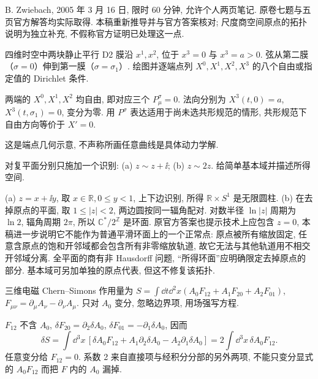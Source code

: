 B. Zwiebach, 2005 年 3 月 16 日, 限时 60 分钟, 允许个人两页笔记. 原卷七题与五页官方解答均实际取得. 本稿重新推导并与官方答案核对; 尺度商空间原点的拓扑说明为独立补充, 不假称官方证明已处理这一点.

\begin{exercise}
四维时空中两块静止平行 D2 膜沿 $x^1,x^2$, 位于 $x^3=0$ 与 $x^3=a>0$. 弦从第二膜（$\sigma=0$）伸到第一膜（$\sigma=\sigma_1$）. 绘图并逐端点列 $X^0,X^1,X^2,X^3$ 的八个自由或指定值的 Dirichlet 条件.
\end{exercise}
\begin{solution}
两端的 $X^0,X^1,X^2$ 均自由, 即对应三个 $P^\sigma_\mu=0$. 法向分别为 $X^3(t,0)=a$, $X^3(t,\sigma_1)=0$, 变分为零. 用 $P^\sigma$ 表达适用于尚未选共形规范的情形, 共形规范下自由方向等价于 $X'=0$.
\begin{center}
\end{center}
这是端点几何示意, 不声称所画任意曲线是具体动力学解.
\end{solution}

\begin{exercise}
对复平面分别只施加一个识别:
(a) $z\sim z+\ii$;
(b) $z\sim2z$.
给简单基本域并描述所得空间.
\end{exercise}
\begin{solution}
(a) $z=x+\ii y$, 取 $x\in\mathbb R,0\leq y<1$, 上下边识别, 所得 $\mathbb R\times S^1$ 是无限圆柱.
(b) 在去掉原点的平面, 取 $1\leq|z|<2$, 两边圆按同一辐角配对. 对数半径 $\ln|z|$ 周期为 $\ln2$, 辐角周期 $2\pi$, 所以 $\mathbb C^*/2^{\mathbb Z}$ 是环面.
原官方答案也提示技术上应包含 $z=0$, 本稿进一步说明它不能作为普通平滑环面上的一个正常点: 原点被所有缩放固定, 任意含原点的饱和开邻域都会包含所有非零缩放轨道, 故它无法与其他轨道用不相交开邻域分离. 全平面的商有非 Hausdorff 问题, “所得环面”应明确限定去掉原点的部分. 基本域可另加单独的原点代表, 但这不修复该拓扑.
\end{solution}

\begin{exercise}
三维电磁 Chern--Simons 作用量为
$S=\int\dd t\dd^2x(A_0F_{12}+A_1F_{20}+A_2F_{01})$,
$F_{\mu\nu}=\partial_\mu A_\nu-\partial_\nu A_\mu$.
只对 $A_0$ 变分, 忽略边界项, 用场强写方程.
\end{exercise}
\begin{solution}
$F_{12}$ 不含 $A_0$, $\delta F_{20}=\partial_2\delta A_0$,
$\delta F_{01}=-\partial_1\delta A_0$, 因而
\[
 \delta S=\int\dd^3x\,[\delta A_0F_{12}
 +A_1\partial_2\delta A_0-A_2\partial_1\delta A_0]
 =2\int\dd^3x\,\delta A_0F_{12}.
\]
任意变分给 $F_{12}=0$. 系数 2 来自直接项与经积分分部的另外两项, 不能只变分显式的 $A_0F_{12}$ 而把 $F$ 内的 $A_0$ 漏掉.
\end{solution}

